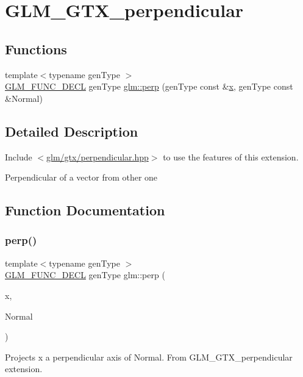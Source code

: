 \hypertarget{group__gtx__perpendicular}{}\section{G\+L\+M\+\_\+\+G\+T\+X\+\_\+perpendicular}
\label{group__gtx__perpendicular}
\subsection*{Functions}
\begin{DoxyCompactItemize}
\item 
{\footnotesize template$<$typename gen\+Type $>$ }\\\hyperlink{setup_8hpp_ab2d052de21a70539923e9bcbf6e83a51}{G\+L\+M\+\_\+\+F\+U\+N\+C\+\_\+\+D\+E\+CL} gen\+Type \hyperlink{group__gtx__perpendicular_ga264cfc4e180cf9b852e943b35089003c}{glm\+::perp} (gen\+Type const \&\hyperlink{_s_d_l__opengl_8h_ad0e63d0edcdbd3d79554076bf309fd47}{x}, gen\+Type const \&Normal)
\end{DoxyCompactItemize}


\subsection{Detailed Description}
Include $<$\hyperlink{perpendicular_8hpp}{glm/gtx/perpendicular.\+hpp}$>$ to use the features of this extension.

Perpendicular of a vector from other one 

\subsection{Function Documentation}
\mbox{\label{group__gtx__perpendicular_ga264cfc4e180cf9b852e943b35089003c}} 
\subsubsection{\texorpdfstring{perp()}{perp()}}
{\footnotesize\ttfamily template$<$typename gen\+Type $>$ \\
\hyperlink{setup_8hpp_ab2d052de21a70539923e9bcbf6e83a51}{G\+L\+M\+\_\+\+F\+U\+N\+C\+\_\+\+D\+E\+CL} gen\+Type glm\+::perp (\begin{DoxyParamCaption}\item[{gen\+Type const \&}]{x,  }\item[{gen\+Type const \&}]{Normal }\end{DoxyParamCaption})}

Projects x a perpendicular axis of Normal. From G\+L\+M\+\_\+\+G\+T\+X\+\_\+perpendicular extension. 
